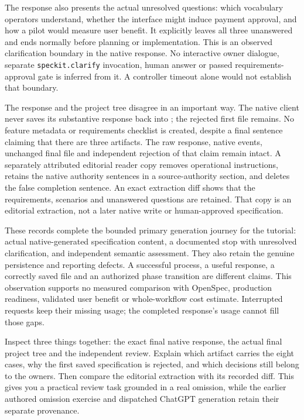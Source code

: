 The response also presents the actual unresolved questions: which vocabulary operators understand, whether the interface might induce payment approval, and how a pilot would measure user benefit. It explicitly leaves all three unanswered and ends normally before planning or implementation. This is an observed clarification boundary in the native response. No interactive owner dialogue, separate \texttt{speckit.clarify} invocation, human answer or passed requirements-approval gate is inferred from it. A controller timeout alone would not establish that boundary.

The response and the project tree disagree in an important way. The native client never saves its substantive response back into ; the rejected first file remains. No feature metadata or requirements checklist is created, despite a final sentence claiming that there are three artifacts. The raw response, native events, unchanged final file and independent rejection of that claim remain intact. A separately attributed editorial reader copy removes operational instructions, retains the native authority sentences in a source-authority section, and deletes the false completion sentence. An exact extraction diff shows that the requirements, scenarios and unanswered questions are retained. That copy is an editorial extraction, not a later native write or human-approved specification.

These records complete the bounded primary generation journey for the tutorial: actual native-generated specification content, a documented stop with unresolved clarification, and independent semantic assessment. They also retain the genuine persistence and reporting defects. A successful process, a useful response, a correctly saved file and an authorized phase transition are different claims. This observation supports no measured comparison with OpenSpec, production readiness, validated user benefit or whole-workflow cost estimate. Interrupted requests keep their missing usage; the completed response's usage cannot fill those gaps.

Inspect three things together: the exact final native response, the actual final project tree and the independent review. Explain which artifact carries the eight cases, why the first saved specification is rejected, and which decisions still belong to the owners. Then compare the editorial extraction with its recorded diff. This gives you a practical review task grounded in a real omission, while the earlier authored omission exercise and dispatched ChatGPT generation retain their separate provenance.

